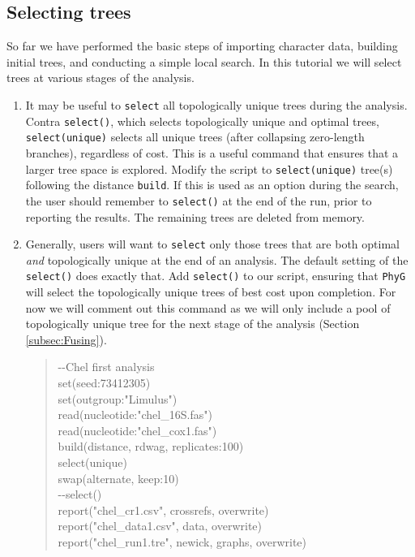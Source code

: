 \documentclass[11pt]{article}
\newcommand{\phyg}{\texttt{PhyG} }
\begin{document}
\subsection{Selecting trees}
\label{subsec:Selecting}

So far we have performed the basic steps of importing character data, building 
initial trees, and conducting a simple local search. In this tutorial we will select 
trees at various stages of the analysis. 

\begin{enumerate}

\item It may be useful to \texttt{select} all topologically unique trees during the 
analysis. Contra \texttt{select()}, which selects topologically unique and optimal 
trees, \texttt{select(unique)} selects all unique trees (after collapsing zero-length 
branches), regardless of cost. This is a useful command that ensures that a 
larger tree space is explored. Modify the script to \texttt{select(unique)} tree(s) 
following the distance \texttt{build}. If this is used as an option during the 
search, the user should remember to \texttt{select()} at the end of the run, 
prior to reporting the results. The remaining trees are deleted from memory.

\item Generally, users will want to \texttt{select} only those trees that are both 
optimal \emph{and} topologically unique at the end of an analysis. The default 
setting of the \texttt{select()} does exactly that. Add \texttt{select()} to our script, 
ensuring that \phyg will select the topologically unique trees of best cost upon 
completion. For now we will comment out this command as we will only include 
a pool of topologically unique tree for the next stage of the analysis (Section 
\ref{subsec:Fusing}).

	\begin{quote}
	-\/-Chel first analysis\\
	set(seed:73412305)\\
	set(outgroup:"Limulus")\\
	read(nucleotide:"chel\_16S.fas")\\
	read(nucleotide:"chel\_cox1.fas")\\
	build(distance, rdwag, replicates:100)\\
	select(unique)\\
	swap(alternate, keep:10)\\
	-\/-select()\\
	report("chel\_cr1.csv", crossrefs, overwrite)\\
	report("chel\_data1.csv", data, overwrite)\\
	report("chel\_run1.tre", newick, graphs, overwrite)\\
	\end{quote}

\end{enumerate}
\end{document}
